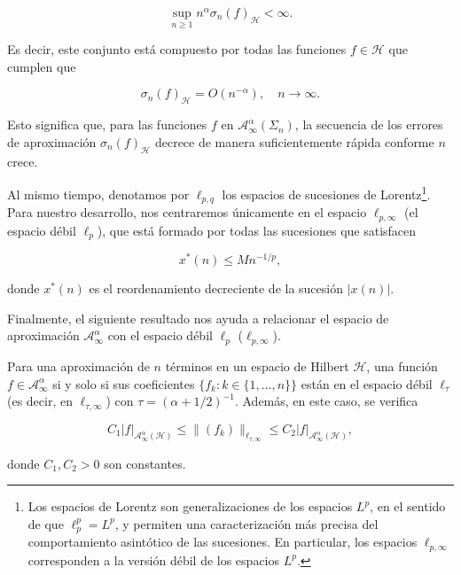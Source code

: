 \[
    \sup_{n \geq 1} n^{\alpha} \sigma_n(f)_{\mathcal{H}} < \infty.
\]

Es decir, este conjunto está compuesto por todas las funciones $f \in \mathcal{H}$ que cumplen que

\[
    \sigma_n(f)_{\mathcal{H}} = O(n^{-\alpha}), \quad n \to \infty.
\]

Esto significa que, para las funciones $f$ en $\mathcal{A}_{\infty}^{\alpha}(\Sigma_n)$, la secuencia de los errores de aproximación $\sigma_n(f)_{\mathcal{H}}$ decrece de manera suficientemente rápida conforme $n$ crece.\newline

Al mismo tiempo, denotamos por $\ell_{p,q}$ los espacios de sucesiones de Lorentz\footnote{Los espacios de Lorentz son generalizaciones de los espacios $L^{p}$, en el sentido de que $\ell_{p}^{p} = L^{p}$, y permiten una caracterización más precisa del comportamiento asintótico de las sucesiones. En particular, los espacios $\ell_{p,\infty}$ corresponden a la versión débil de los espacios $L^{p}$.}. Para nuestro desarrollo, nos centraremos únicamente en el espacio $\ell_{p,\infty}$ (el espacio débil $\ell_{p}$), que está formado por todas las sucesiones que satisfacen

\[
    x^{*}(n) \leq M n^{-1/p},
\]

donde $x^{*}(n)$ es el reordenamiento decreciente de la sucesión $|x(n)|$.\newline

Finalmente, el siguiente resultado nos ayuda a relacionar el espacio de aproximación $\mathcal{A}_{\infty}^{\alpha}$ con el espacio débil $\ell_p$ ($\ell_{p,\infty}$).

\begin{teorema}\label{teo:espaciosapprox-espacioslorentz}
    Para una aproximación de $n$ términos en un espacio de Hilbert $\mathcal{H}$, una función $f \in \mathcal{A}_{\infty}^{\alpha}$ si y solo si sus coeficientes $\{ f_k : k \in \{1, \ldots, n\}\}$ están en el espacio débil $\ell_{\tau}$ (es decir, en $\ell_{\tau, \infty}$) con $\tau = (\alpha + 1/2)^{-1}$. Además, en este caso, se verifica

    \[
        C_1 |f|_{\mathcal{A}_{\infty}^{\alpha}(\mathcal{H})} \leq \| (f_k) \|_{\ell_{\tau, \infty}} \leq C_2 |f|_{\mathcal{A}_{\infty}^{\alpha}(\mathcal{H})},
    \]

    donde $C_1, C_2 > 0$ son constantes.\newline
\end{teorema}

